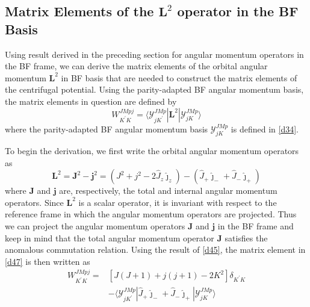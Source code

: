 \documentclass[]{article}
\begin{document}
\subsection{Matrix Elements of the $\mathbf{L}^2$ operator in the BF Basis}
Using result derived in the preceding section for angular momentum operators in the BF frame, we can derive the matrix elements of the orbital angular momentum $\mathbf{L}^2$ in BF basis that are needed to construct the matrix elements of the centrifugal potential. Using the parity-adapted BF angular momentum basis, the matrix elements in question are defined by
\begin{equation}
	W^{JMpj}_{K^\prime K}=\langle \mathcal{Y}^{JMp}_{jK^\prime}|\mathbf{L}^2|\mathcal{Y}^{JMp}_{jK}\rangle
	\label{d47}
\end{equation}
where the parity-adapted BF angular momentum basis $\mathcal{Y}^{JMp}_{jK}$ is defined in \eqref{d34}.\par 
To begin the derivation, we first write the orbital angular momentum operators as
\begin{equation}
	\mathbf{L}^2=\mathbf{J}^2-\mathbf{j}^2=(J^2+j^2-2\hat{J}_z\hat{\jmath}_z)-(\hat{J}_+\hat{\jmath}_-+\hat{J}_-\hat{\jmath}_+)
\end{equation}
where $\mathbf{J}$ and $\mathbf{j}$ are, respectively, the total and internal angular momentum operators. Since $\mathbf{L}^2$ is a scalar operator, it is invariant with respect to the reference frame in which the angular momentum operators are projected. Thus we can project the angular momentum operators $\mathbf{J}$ and $\mathbf{j}$ in the BF frame and keep in mind that the total angular momentum operator $\mathbf{J}$ satisfies the anomalous commutation relation. Using the result of  \eqref{d45}, the matrix element in \eqref{d47} is then written as
\begin{align}
	W^{JMpj}_{K^\prime K}=&[J(J+1)+j(j+1)-2K^2]\delta_{K^\prime K}\nonumber\\
	&-\langle \mathcal{Y}^{JMp}_{jK^\prime}|\hat{J}_+\hat{\jmath}_-+\hat{J}_-\hat{\jmath}_+|\mathcal{Y}^{JMp}_{jK}\rangle
	\label{d49}
\end{align}
\end{document}

